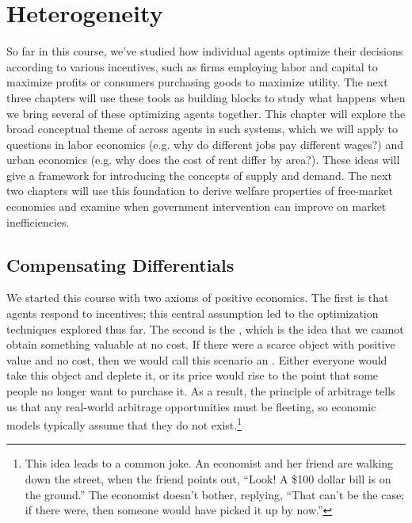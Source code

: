 \chapter{Heterogeneity}

So far in this course, we've studied how individual agents optimize their decisions according to various incentives, such as firms employing labor and capital to maximize profits or consumers purchasing goods to maximize utility. The next three chapters will use these tools as building blocks to study what happens when we bring several of these optimizing agents together. This chapter will explore the broad conceptual theme of  across agents in such systems, which we will apply to questions in labor economics (e.g. why do different jobs pay different wages?) and urban economics (e.g. why does the cost of rent differ by area?). These ideas will give a framework for introducing the concepts of supply and demand. The next two chapters will use this foundation to derive welfare properties of free-market economies and examine when government intervention can improve on market inefficiencies.

\section{Compensating Differentials}

We started this course with two axioms of positive economics. The first is that agents respond to incentives; this central assumption led to the optimization techniques explored thus far. The second is the , which is the idea that we cannot obtain something valuable at no cost. If there were a scarce object with positive value and no cost, then we would call this scenario an . Either everyone would take this object and deplete it, or its price would rise to the point that some people no longer want to purchase it. As a result, the principle of arbitrage tells us that any real-world arbitrage opportunities must be fleeting, so economic models typically assume that they do not exist.\footnote{This idea leads to a common joke. An economist and her friend are walking down the street, when the friend points out, ``Look! A \$100 dollar bill is on the ground.'' The economist doesn't bother, replying, ``That can't be the case; if there were, then someone would have picked it up by now.''}

